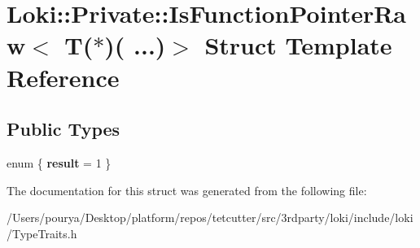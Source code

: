\hypertarget{structLoki_1_1Private_1_1IsFunctionPointerRaw_3_01T_07_5_08_07_01_01_01_01_01_01_01_01_01_01_01_d34964cb6264b099e166d992b8dfd787}{}\section{Loki\+:\+:Private\+:\+:Is\+Function\+Pointer\+Raw$<$ T($\ast$)( ...)$>$ Struct Template Reference}
\label{structLoki_1_1Private_1_1IsFunctionPointerRaw_3_01T_07_5_08_07_01_01_01_01_01_01_01_01_01_01_01_d34964cb6264b099e166d992b8dfd787}
\subsection*{Public Types}
\begin{DoxyCompactItemize}
\item 
\hypertarget{structLoki_1_1Private_1_1IsFunctionPointerRaw_3_01T_07_5_08_07_01_01_01_01_01_01_01_01_01_01_01_d34964cb6264b099e166d992b8dfd787_a447259d1820279cf9756a911148281a8}{}enum \{ {\bfseries result} = 1
 \}\label{structLoki_1_1Private_1_1IsFunctionPointerRaw_3_01T_07_5_08_07_01_01_01_01_01_01_01_01_01_01_01_d34964cb6264b099e166d992b8dfd787_a447259d1820279cf9756a911148281a8}

\end{DoxyCompactItemize}


The documentation for this struct was generated from the following file\+:\begin{DoxyCompactItemize}
\item 
/\+Users/pourya/\+Desktop/platform/repos/tetcutter/src/3rdparty/loki/include/loki/Type\+Traits.\+h\end{DoxyCompactItemize}
